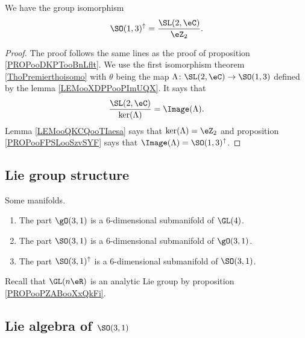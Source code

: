 \begin{theorem}
	We have the group isomorphism
	\begin{equation}
		\SO(1,3)^{\uparrow}=\frac{ \SL(2,\eC) }{ \eZ_2 }.
	\end{equation}
\end{theorem}

\begin{proof}
	The proof follows the same lines as the proof of proposition \ref{PROPooDKPTooBnLflt}. We use the first isomorphism theorem \ref{ThoPremierthoisomo} with \( \theta\) being the map \( \Lambda\colon \SL(2,\eC)\to \SO(1,3)\) defined by the lemma \ref{LEMooXDPPooPImUQX}. It says that
	\begin{equation}
		\frac{ \SL(2,\eC) }{ \ker(\Lambda) }=\Image(\Lambda).
	\end{equation}
	Lemma \ref{LEMooQKCQooTIaesa} says that \( \ker(\Lambda)=\eZ_2\) and proposition \ref{PROPooFPSLooSzvSYF} says that \( \Image(\Lambda)=\SO(1,3)^{\uparrow}\).
\end{proof}

\subsection{Lie group structure}

\begin{lemma}       \label{LEMooISDKooUnafZR}
	Some manifolds.
	\begin{enumerate}
		\item
		      The part \( \gO(3,1)\) is a \( 6\)-dimensional submanifold of \( \GL(4)\).
		\item
		      The part \( \SO(3,1)\) is a \( 6\)-dimensional submanifold of \( \gO(3,1)\).
		\item
		      The part \( \SO(3,1)^{\uparrow}\) is a \( 6\)-dimensional submanifold of \( \SO(3,1)\).
	\end{enumerate}
\end{lemma}
Recall that \( \GL(n\eR)\) is an analytic Lie group by proposition \ref{PROPooPZABooXxQkFi}.


\subsection{Lie algebra of \( \SO(3,1)\)}

